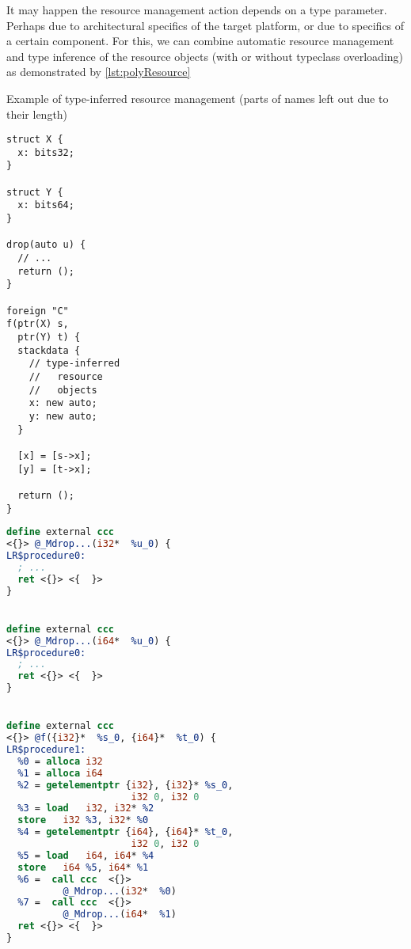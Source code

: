 It may happen the resource management action depends on a type parameter. Perhaps due to architectural specifics of the target platform, or due to specifics of a certain component. For this, we can combine automatic resource management and type inference of the resource objects (with or without typeclass overloading) as demonstrated by \cref{lst:polyResource}

\begin{listing}
    \small
    \caption{Example of type-inferred resource management (parts of names left out due to their length)}
    \label{lst:polyResource}
    \begin{center}
    \begin{minipage}{0.35\linewidth}
    \begin{lstlisting}
struct X {
  x: bits32;
}

struct Y {
  x: bits64;
}

drop(auto u) {
  // ...
  return ();
}

foreign "C"
f(ptr(X) s,
  ptr(Y) t) {
  stackdata {
    // type-inferred
    //   resource
    //   objects
    x: new auto;
    y: new auto;
  }

  [x] = [s->x];
  [y] = [t->x];

  return ();
}
    \end{lstlisting}
    \end{minipage}%
    \begin{minipage}{0.65\linewidth}
    \begin{lstlisting}[language=LLVM]
define external ccc
<{}> @_Mdrop...(i32*  %u_0) {
LR$procedure0:
  ; ...
  ret <{}> <{  }>
}


define external ccc
<{}> @_Mdrop...(i64*  %u_0) {
LR$procedure0:
  ; ...
  ret <{}> <{  }>
}


define external ccc
<{}> @f({i32}*  %s_0, {i64}*  %t_0) {
LR$procedure1:
  %0 = alloca i32
  %1 = alloca i64
  %2 = getelementptr {i32}, {i32}* %s_0,
                      i32 0, i32 0
  %3 = load   i32, i32* %2
  store   i32 %3, i32* %0
  %4 = getelementptr {i64}, {i64}* %t_0,
                      i32 0, i32 0
  %5 = load   i64, i64* %4
  store   i64 %5, i64* %1
  %6 =  call ccc  <{}>
          @_Mdrop...(i32*  %0)
  %7 =  call ccc  <{}>
          @_Mdrop...(i64*  %1)
  ret <{}> <{  }>
}
    \end{lstlisting}
    \end{minipage}
    \end{center}
\end{listing}

